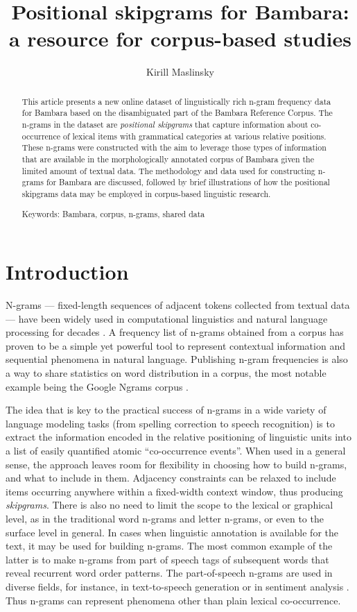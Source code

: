 \documentclass[12pt]{article}
\author{Kirill Maslinsky}
\title{Positional skipgrams for Bambara: a resource for corpus-based studies}
\begin{document}
\maketitle

\begin{abstract}
  This article presents a new online dataset of linguistically rich
  n-gram frequency data for Bambara based on the disambiguated part of
  the Bambara Reference Corpus. The n-grams in the dataset are
  \textit{positional skipgrams} that capture information about
  co-occurrence of lexical items with grammatical categories at
  various relative positions. These n-grams were constructed with the
  aim to leverage those types of information that are available in the
  morphologically annotated corpus of Bambara given the limited amount
  of textual data. The methodology and data used for constructing
  n-grams for Bambara are discussed, followed by brief illustrations
  of how the positional skipgrams data may be employed in corpus-based
  linguistic research.

  Keywords: Bambara, corpus, n-grams, shared data
\end{abstract}

\section{Introduction}

N-grams — fixed-length sequences of adjacent tokens collected from
textual data — have been widely used in computational linguistics and
natural language processing for decades \autocite{rosenfeld2000two}. A
frequency list of n-grams obtained from a corpus has proven to be a
simple yet powerful tool to represent contextual information and
sequential phenomena in natural language. Publishing n-gram
frequencies is also a way to share statistics on word distribution in
a corpus, the most notable example being the Google Ngrams corpus
\autocite{brants2006google}.

The idea that is key to the practical success of n-grams in a wide
variety of language modeling tasks (from spelling correction to speech
recognition) is to extract the information encoded in the relative
positioning of linguistic units into a list of easily quantified
atomic “co-occurrence events”.  When used in a general sense, the
approach leaves room for flexibility in choosing how to build n-grams,
and what to include in them. Adjacency constraints can be relaxed to
include items occurring anywhere within a fixed-width context window,
thus producing \textit{skipgrams}. There is also no need to limit the
scope to the lexical or graphical level, as in the traditional word
n-grams and letter n-grams, or even to the surface level in
general. In cases when linguistic annotation is available for the
text, it may be used for building n-grams. The most common example of
the latter is to make n-grams from part of speech tags of subsequent
words that reveal recurrent word order patterns. The part-of-speech
n-grams are used in diverse fields, for instance, in text-to-speech
generation \autocite{taylor1998assigning} or in sentiment analysis
\autocite{jaggi2014swiss}.  Thus n-grams can represent phenomena other
than plain lexical co-occurrence.
\end{document}
